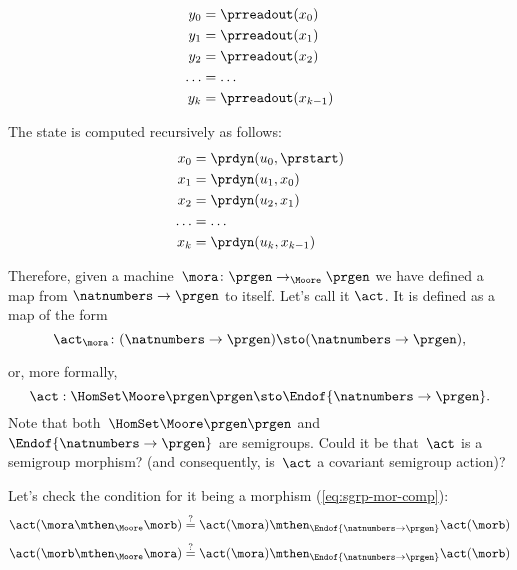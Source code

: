 \begin{equation}
    \label{eq:actions-on-sequences-y}
    \begin{aligned}
        y_0 &= \prreadout(x_0) \\
        y_1 &= \prreadout(x_1) \\
        y_2 &= \prreadout(x_2) \\
        \dots &= \dots  \\
        y_{k} &= \prreadout(x_{k-1})
    \end{aligned}
\end{equation}

The state is computed recursively as follows:
\begin{equation}
    \label{eq:actions-on-sequences-x}
    \begin{aligned}
        x_0 &= \prdyn(u_0, \prstart) \\
        x_1 &= \prdyn(u_1, x_0) \\
        x_2 &= \prdyn(u_2, x_1) \\
        \dots &= \dots \\
        x_{k} &= \prdyn(u_{k}, x_{k-1})
    \end{aligned}
\end{equation}

Therefore, given a machine~$\mora \colon \prgen \to_{\Moore} \prgen$ we have defined a map from $\natnumbers \to \prgen$ to itself. Let's call it $\act$. It is defined as a map of the form
%
\begin{equation}
    \label{eq:actions-on-sequences-1}
    \act_{\mora}\colon  (\natnumbers \to \prgen)  \sto  (\natnumbers \to \prgen),
\end{equation}

%
or, more formally,
%
\begin{equation}
    \label{eq:actions-on-sequences-2}
    \act: \HomSet\Moore\prgen\prgen \sto \Endof {\natnumbers \to \prgen}.
\end{equation}
%
Note that both~$\HomSet\Moore\prgen\prgen$ and $\Endof {\natnumbers \to \prgen}$ are semigroups.
Could it be that~$\act$ is a semigroup morphism? (and consequently, is~$\act$ a covariant semigroup action)?

Let's check the condition for it being a morphism (\cref{eq:sgrp-mor-comp}):
%
\begin{equation}
    \label{eq:actions-on-sequences-left}
    \act ( \mora \mthen_{\Moore} \morb) \stackrel{?}{=}  \act ( \mora) \mthen_{\Endof  {\natnumbers \to \prgen}} \act(\morb)
\end{equation}
%
\begin{equation}
    \label{eq:actions-on-sequences-right}
    \act ( \morb \mthen_{\Moore} \mora) \stackrel{?}{=}  \act ( \mora) \mthen_{\Endof  {\natnumbers \to \prgen}} \act(\morb)
\end{equation}


